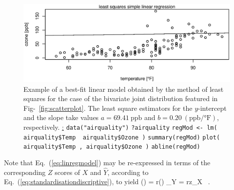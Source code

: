 %
\begin{figure}[!htb]
\begin{center}
\includegraphics[scale=0.8]{linReg.eps}
\end{center}
\caption{Example of a best-fit linear model obtained by the method
of least squares for the case of the bivariate joint distribution
featured in Fig-~\ref{fig:scatterplot}. The least square estimators
for the $y$-intercept and the slope take values
$a = 69.41~\text{ppb}$ and
$b = 0.20~(\text{ppb}/\text{°F})$, respectively. \newline
\underline{\R:} \newline
\texttt{data("airquality")} \newline
\texttt{?airquality} \newline
\texttt{regMod <- lm( airquality\$Temp~\texttildelow~airquality\$Ozone )} \newline
\texttt{summary(regMod)} \newline
\texttt{plot( airquality\$Temp , airquality\$Ozone )} \newline
\texttt{abline(regMod)}}
\end{figure}
%

\medskip
\noindent
Note that Eq.~(\ref{eq:linregmodel}) may be re-expressed in terms 
of the corresponding $Z$ scores of $X$ and $\hat{Y}$, according to
Eq.~(\ref{eq:standardisationdiscriptive}), to yield
%
\be
\left(\right)
= r\left(\right)
\qquad\Leftrightarrow\qquad
{}_{Y} = rz_{X} \ .
\ee
%

